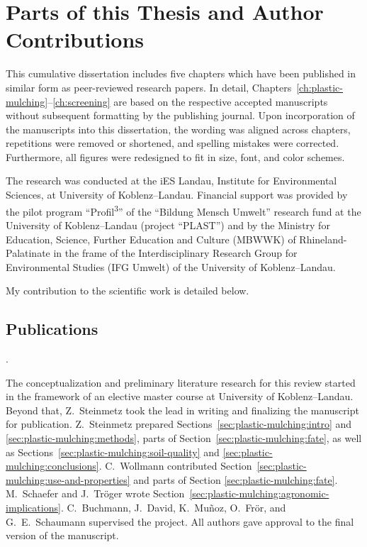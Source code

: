 
\chapter{Parts of this Thesis and Author Contributions}
\label{ch:author-contributions}

This cumulative dissertation includes five chapters which have been published in similar form as peer-reviewed research papers.
In detail, Chapters~\ref{ch:plastic-mulching}--\ref{ch:screening} are based on the respective accepted manuscripts without subsequent formatting by the publishing journal.
Upon incorporation of the manuscripts into this dissertation, the wording was aligned across chapters, repetitions were removed or shortened, and spelling mistakes were corrected. Furthermore, all figures were redesigned to fit in size, font, and color schemes.

The research was conducted at the iES Landau, Institute for Environmental Sciences, at University of Koblenz--Landau. Financial support was provided by the pilot program ``Profil\textsuperscript{3}'' of the ``\foreignlanguage{ngerman}{Bildung Mensch Umwelt}'' research fund at the University of Koblenz--Landau (project ``PLAST'') and by the Ministry for Education, Science, Further Education and Culture (MBWWK) of Rhineland-Palatinate in the frame of the Interdisciplinary Research Group for Environmental Studies (\foreignlanguage{ngerman}{IFG Umwelt}) of the University of Koblenz--Landau.

My contribution to the scientific work is detailed below.

\section*{Publications}

\vspace{0.5\baselineskip}
\noindent{}.

\begin{description}
	\setlength\itemsep{0em}
	\item[Author contributions:] The conceptualization and preliminary literature research for this review started in the framework of an elective master course at University of Koblenz--Landau. Beyond that, Z.~Steinmetz took the lead in writing and finalizing the manuscript for publication. Z.~Steinmetz prepared Sections~\ref{sec:plastic-mulching:intro} and \ref{sec:plastic-mulching:methods}, parts of Section~\ref{sec:plastic-mulching:fate}, as well as Sections~\ref{sec:plastic-mulching:soil-quality} and \ref{sec:plastic-mulching:conclusions}. C.~Wollmann contributed Section~\ref{sec:plastic-mulching:use-and-properties} and parts of Section \ref{sec:plastic-mulching:fate}. M.~Schaefer and J.~Tröger wrote Section~\ref{sec:plastic-mulching:agronomic-implications}. C.~Buchmann, J.~David, K.~Muñoz, O.~Frör, and G.~E.~Schaumann supervised the project. All authors gave approval to the final version of the manuscript.
\end{description}

